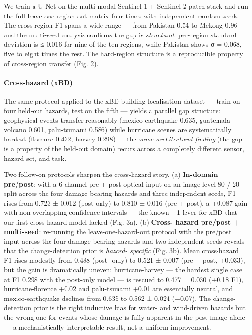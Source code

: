 We train a U-Net on the multi-modal Sentinel-1 + Sentinel-2 patch stack and
run the full leave-one-region-out matrix four times with independent random
seeds. The cross-region F1 spans a wide range --- from Pakistan 0.54 to Mekong
0.96 --- and the multi-seed analysis confirms the gap is \emph{structural}: per-region
standard deviation is ≤ 0.016 for nine of the ten regions, while Pakistan
shows σ = 0.068, five to eight times the rest. The hard-region structure is a
reproducible property of cross-region transfer (Fig. 2).

\paragraph{Cross-hazard (xBD)}\label{cross-hazard-xbd}

The same protocol applied to the xBD building-localisation dataset --- train on
four held-out hazards, test on the fifth --- yields a parallel gap structure:
geophysical events transfer reasonably (mexico-earthquake 0.635, guatemala-
volcano 0.601, palu-tsunami 0.586) while hurricane scenes are systematically
hardest (florence 0.432, harvey 0.298) --- the \emph{same architectural finding} (the
gap is a property of the held-out domain) recurs across a completely different
sensor, hazard set, and task.

Two follow-on protocols sharpen the cross-hazard story. (a) \textbf{In-domain
pre/post}: with a 6-channel pre + post optical input on an image-level
80 / 20 split across the four damage-bearing hazards and three independent
seeds, F1 rises from 0.723 ± 0.012 (post-only) to 0.810 ± 0.016 (pre + post),
a +0.087 gain with non-overlapping confidence intervals --- the known +1 lever
for xBD that our first cross-hazard model lacked (Fig. 3a). (b) \textbf{Cross-
hazard pre/post + multi-seed}: re-running the leave-one-hazard-out protocol
with the pre/post input across the four damage-bearing hazards and two
independent seeds reveals that the change-detection prior is \emph{hazard-
specific} (Fig. 3b). Mean cross-hazard F1 rises modestly from 0.488 (post-
only) to 0.521 ± 0.007 (pre + post, +0.033), but the gain is dramatically
uneven: hurricane-harvey --- the hardest single case at F1 0.298 with the
post-only model --- is rescued to 0.477 ± 0.030 (+0.18 F1), hurricane-florence
+0.02 and palu-tsunami +0.01 are essentially neutral, and mexico-earthquake
declines from 0.635 to 0.562 ± 0.024 (−0.07). The change-detection prior is
the right inductive bias for water- and wind-driven hazards but the wrong one
for events whose damage is fully apparent in the post image alone --- a
mechanistically interpretable result, not a uniform improvement.

